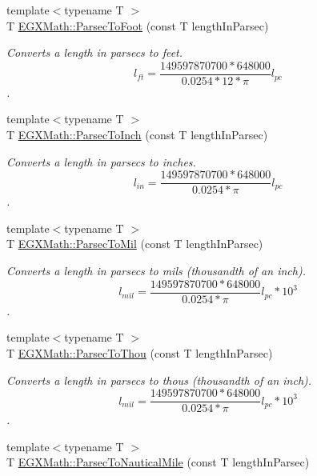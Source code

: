 \begin{DoxyCompactItemize}
{\footnotesize template$<$typename T $>$ }\\T \mbox{\hyperlink{group___e_g_x_math-_conversions-_length_conversions-_astronomical-_parsec-_imperial_ga2c9e8ada868b6915660db313612ac550}{E\+G\+X\+Math\+::\+Parsec\+To\+Foot}} (const T length\+In\+Parsec)
\begin{DoxyCompactList}\small\item\em Converts a length in parsecs to feet. \[ l_{ft}= \frac{149597870700 * 648000}{0.0254 * 12 * \pi} l_{pc} \]. \end{DoxyCompactList}\item 
{\footnotesize template$<$typename T $>$ }\\T \mbox{\hyperlink{group___e_g_x_math-_conversions-_length_conversions-_astronomical-_parsec-_imperial_gaebc7c4ce22fe7ae0ae26420284598c29}{E\+G\+X\+Math\+::\+Parsec\+To\+Inch}} (const T length\+In\+Parsec)
\begin{DoxyCompactList}\small\item\em Converts a length in parsecs to inches. \[ l_{in}= \frac{149597870700 * 648000}{0.0254 * \pi} l_{pc} \]. \end{DoxyCompactList}\item 
{\footnotesize template$<$typename T $>$ }\\T \mbox{\hyperlink{group___e_g_x_math-_conversions-_length_conversions-_astronomical-_parsec-_imperial_ga7ff283e88a975e05bd987930e8b3cbf2}{E\+G\+X\+Math\+::\+Parsec\+To\+Mil}} (const T length\+In\+Parsec)
\begin{DoxyCompactList}\small\item\em Converts a length in parsecs to mils (thousandth of an inch). \[ l_{mil}= \frac{149597870700 * 648000}{0.0254 * \pi} l_{pc} * 10^{3} \]. \end{DoxyCompactList}\item 
{\footnotesize template$<$typename T $>$ }\\T \mbox{\hyperlink{group___e_g_x_math-_conversions-_length_conversions-_astronomical-_parsec-_imperial_ga0e473cc0d93ca332b9fc42ed6f8d73c6}{E\+G\+X\+Math\+::\+Parsec\+To\+Thou}} (const T length\+In\+Parsec)
\begin{DoxyCompactList}\small\item\em Converts a length in parsecs to thous (thousandth of an inch). \[ l_{mil}= \frac{149597870700 * 648000}{0.0254 * \pi} l_{pc} * 10^{3} \]. \end{DoxyCompactList}\item 
{\footnotesize template$<$typename T $>$ }\\T \mbox{\hyperlink{group___e_g_x_math-_conversions-_length_conversions-_astronomical-_parsec-_nautical_ga34adb714e6f4da104b25e2b5a2ab114e}{E\+G\+X\+Math\+::\+Parsec\+To\+Nautical\+Mile}} (const T length\+In\+Parsec)

\end{DoxyCompactItemize}
